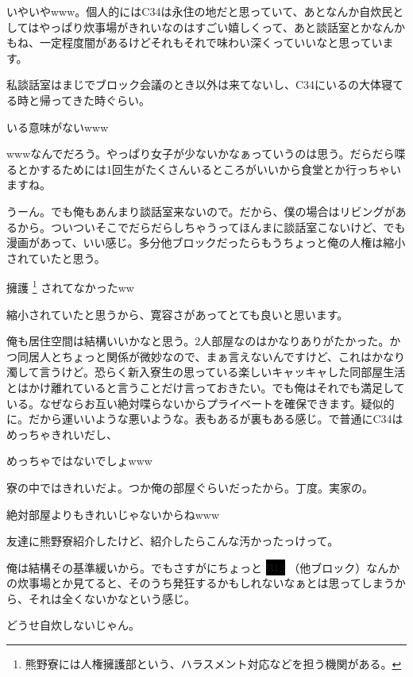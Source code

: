 \begin{multicols}{2}
  
いやいやwww。個人的にはC34は永住の地だと思っていて、あとなんか自炊民としてはやっぱり炊事場がきれいなのはすごい嬉しくって、あと談話室とかなんかもね、一定程度闇があるけどそれもそれで味わい深くっていいなと思っています。

  
私談話室はまじでブロック会議のとき以外は来てないし、C34にいるの大体寝てる時と帰ってきた時ぐらい。

  
いる意味がないwww

  
wwwなんでだろう。やっぱり女子が少ないかなぁっていうのは思う。だらだら喋るとかするためには1回生がたくさんいるところがいいから食堂とか行っちゃいますね。

  
うーん。でも俺もあんまり談話室来ないので。だから、僕の場合はリビングがあるから。ついついそこでだらだらしちゃうってほんまに談話室こないけど、でも漫画があって、いい感じ。多分他ブロックだったらもうちょっと俺の人権は縮小されていたと思う。

  
擁護 \footnote {熊野寮には人権擁護部という、ハラスメント対応などを担う機関がある。} されてなかったww

  
縮小されていたと思うから、寛容さがあってとても良いと思います。
  
俺も居住空間は結構いいかなと思う。2人部屋なのはかなりありがたかった。かつ同居人とちょっと関係が微妙なので、まぁ言えないんですけど、これはかなり濁して言うけど。恐らく新入寮生の思っている楽しいキャッキャした同部屋生活とはかけ離れていると言うことだけ言っておきたい。でも俺はそれでも満足している。なぜならお互い絶対喋らないからプライベートを確保できます。疑似的に。だから運いいような悪いような。表もあるが裏もある感じ。で普通にC34はめっちゃきれいだし、

  
めっちゃではないでしょwww

  
寮の中ではきれいだよ。つか俺の部屋ぐらいだったから。丁度。実家の。

  
絶対部屋よりもきれいじゃないからねwww

  
友達に熊野寮紹介したけど、紹介したらこんな汚かったっけって。

  
俺は結構その基準緩いから。でもさすがにちょっと \colorbox{black}{B12} （他ブロック）なんかの炊事場とか見てると、そのうち発狂するかもしれないなぁとは思ってしまうから、それは全くないかなという感じ。

  
どうせ自炊しないじゃん。


\end{multicols}
